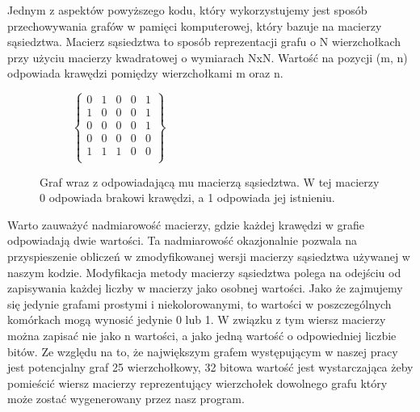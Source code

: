 \documentclass[11pt]{article}
\begin{document}
Jednym z aspektów powyższego kodu, który wykorzystujemy jest sposób przechowywania grafów w pamięci komputerowej, który bazuje na macierzy sąsiedztwa. Macierz sąsiedztwa to sposób reprezentacji grafu o N wierzchołkach przy użyciu macierzy kwadratowej o wymiarach NxN. Wartość na pozycji (m, n) odpowiada  krawędzi pomiędzy wierzchołkami m oraz n.
\begin{figure}[h]
\begin{subfigure}{0.5\textwidth}
  \end{subfigure}
  \begin{subfigure}{0.5\textwidth}
$\begin{Bmatrix}
	0 & 1 & 0 & 0 & 1 \\
	1 & 0 & 0 & 0 & 1 \\
	0 & 0 & 0 & 0 & 1 \\
	0 & 0 & 0 & 0 & 0 \\
	1 & 1 & 1 & 0 & 0 \\
	\end{Bmatrix}$
	
	\end{subfigure}
	\caption{Graf wraz z odpowiadającą mu macierzą sąsiedztwa. W tej macierzy 0 odpowiada brakowi krawędzi, a 1 odpowiada jej istnieniu.}
\end{figure}

Warto zauważyć nadmiarowość macierzy, gdzie każdej krawędzi w grafie odpowiadają dwie wartości. Ta nadmiarowość okazjonalnie pozwala na przyspieszenie obliczeń w zmodyfikowanej wersji macierzy sąsiedztwa używanej w naszym kodzie.
Modyfikacja metody macierzy sąsiedztwa polega na odejściu od zapisywania każdej liczby w macierzy jako osobnej wartości. Jako że zajmujemy się jedynie grafami prostymi i niekolorowanymi, to wartości w poszczególnych komórkach mogą wynosić jedynie 0 lub 1. W związku z tym wiersz macierzy można zapisać nie jako n wartości, a jako jedną wartość o odpowiedniej liczbie bitów. Ze względu na to, że największym grafem występującym w naszej pracy jest potencjalny graf 25 wierzchołkowy, 32 bitowa wartość jest wystarczająca żeby pomieścić wiersz macierzy reprezentujący wierzchołek dowolnego grafu który może zostać wygenerowany przez nasz program. 
 
\end{document}
